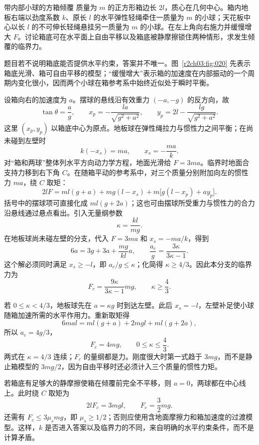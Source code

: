 \begin{practicebox}{带内部小球的方箱倾覆}
质量为 $m$ 的正方形箱边长 $2l$，质心在几何中心。箱内地板右端以劲度系数 $k$、原长 $l$ 的水平弹性轻绳牵住一质量为 $m$ 的小球；天花板中心以长 $l$ 的不可伸长轻绳悬挂另一质量为 $m$ 的小球。在左上角向右施力并缓慢增大 $F$。讨论箱底可在水平面上自由平移以及箱底被静摩擦锁住两种情形，求发生倾覆的临界力。
\label{r2ch03:pr:004}
\begin{solution}
题目若不说明箱底能否提供水平约束，答案并不唯一。图~\ref{r2ch03:fig:020} 先表示箱底光滑、箱可自由平移的模型；“缓慢增大”表示箱的加速度在内部振动的一个周期内变化很小，因而两个小球在箱参考系中始终近似处于瞬时平衡。
\figBoxTip

设箱向右的加速度为 $a$。摆球的悬线沿有效重力 $(-a,-g)$ 的反方向，故
\[
 \tan\theta=\frac ag,\qquad
 x_p=-\frac{la}{\sqrt{g^2+a^2}},\qquad
 y_p=2l-\frac{lg}{\sqrt{g^2+a^2}}.
\]
这里 $(x_p,y_p)$ 以箱底中心为原点。地板球在弹性绳拉力与惯性力之间平衡；在尚未碰到左壁时
\[
 k(-x_s)=ma,\qquad x_s=-\frac{ma}{k}.
\]
对“箱和两球”整体列水平方向动力学方程，地面光滑给 $F=3ma$。临界时地面合支持力移到右下角 $C$。在随箱平动的参考系中，对三个质量分别附加向左的惯性力 $ma$，绕 $C$ 取矩：
\[
 2lF=m l(g+a)+mg(l-x_s)
 +m\bigl[g(l-x_p)+ay_p\bigr].
\]
括号中的摆球项可直接化成 $ml(g+2a)$；这也可由摆球所受重力与惯性力的合力沿悬线通过悬点看出。引入无量纲参数
\[
 \kappa=\frac{kl}{mg}.
\]
在地板球尚未碰左壁的分支，代入 $F=3ma$ 和 $x_s=-ma/k$，得到
\[
 6a=3g+3a+\frac{mg}{kl}a,\qquad
 \frac{a_c}{g}=\frac{3\kappa}{3\kappa-1}.
\]
这个解必须同时满足 $x_s\ge-l$，即 $a_c/g\le\kappa$；化简得 $\kappa\ge4/3$。因此本分支的临界力为
\[
 \boxed{F_c=\frac{9\kappa}{3\kappa-1}mg},
 \qquad \kappa\ge\frac43.
\]

若 $0\le\kappa<4/3$，地板球先在 $a=\kappa g$ 时到达左壁。此后 $x_s=-l$，左壁补足使小球随箱加速所需的水平作用力。重新取矩得
\[
 6mal=ml(g+a)+2mgl+ml(g+2a),
\]
所以 $a_c=4g/3$，
\[
 \boxed{F_c=4mg},\qquad 0\le\kappa\le\frac43.
\]
两式在 $\kappa=4/3$ 连续；$F_c$ 的量纲都是力。刚度很大时第一式趋于 $3mg$，而不是静止箱模型的 $3mg/2$，因为自由平移时还必须计入三个质量的惯性力矩。

若箱底有足够大的静摩擦使箱在倾覆前完全不平移，则 $a=0$，两球都在中心线上。此时绕 $C$ 取矩为
\[
 2lF_c=3mgl,\qquad \boxed{F_c=\frac32mg}.
\]
还需有 $F_c\le3\mu_smg$，即 $\mu_s\ge1/2$；否则应使用含地面摩擦力和箱加速度的过渡模型。这样，$k$ 是否进入答案以及临界力的不同，来自明确的水平约束条件，而不是计算矛盾。
\end{solution}
\end{practicebox}

